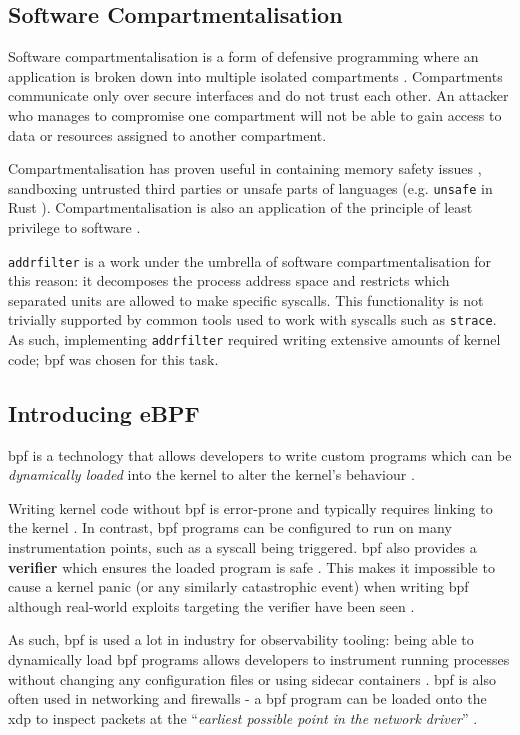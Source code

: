 \subsection{Software Compartmentalisation}
Software compartmentalisation is a form of defensive programming where an
application is broken down into multiple isolated compartments \cite{SOK}. Compartments
communicate only over secure interfaces and do not trust each other. An attacker
who manages to compromise one compartment will not be able to gain access to
data or resources assigned to another compartment. 

Compartmentalisation has proven useful in containing memory safety issues
\cite{CONFFUZZ},
sandboxing untrusted third parties \cite{ANDROID_SOK} or unsafe parts of
languages \cite{MPK} (e.g.
\texttt{unsafe} in Rust \cite{rustbook_unsafe}). Compartmentalisation is also an
application of the principle of least privilege to software \cite{PRIVMAN}.

\texttt{addrfilter} is a work under the umbrella of software
compartmentalisation for this reason: it decomposes the process address space
and restricts which separated units are allowed to make specific syscalls.
This functionality is not trivially supported by common tools used to work with
syscalls such as \texttt{strace}. As such, implementing \texttt{addrfilter}
required writing extensive amounts of kernel code; \ac{bpf} was chosen for this
task.

\subsection{Introducing eBPF}

\ac{bpf} is a technology that allows developers to write custom programs which
can be \textit{dynamically loaded} into the kernel to alter the kernel's
behaviour \cite{LEARNING_EBPF}. 

Writing kernel code without \ac{bpf} is error-prone and typically
requires linking to the kernel \cite{UNDERSTANDING_LINUX_KERNEL}. In contrast,
\ac{bpf} programs can be configured to run on many instrumentation points, such
as a syscall being triggered. \ac{bpf} also provides a \textbf{verifier} which
ensures the  loaded program is safe \cite{LEARNING_EBPF}.
This makes it impossible to cause a kernel panic (or any similarly
catastrophic event) when writing \ac{bpf} although real-world exploits targeting the
verifier have been seen \cite{BPF_VERIFIER_EXPLOIT}. 

As such, \ac{bpf} is used a lot in industry for observability tooling: being able to
dynamically load \ac{bpf} programs allows developers to instrument running processes
without changing any configuration files or using sidecar containers \cite{SIDECAR}.
\ac{bpf} is also often used in networking and firewalls 
\cite{LINUX_NETWORKING_OBSERVABILITY} - a \ac{bpf} program can
be loaded onto the \ac{xdp} to inspect packets at the ``\textit{earliest 
possible point in the network driver}'' \cite{CILIUM_BPF_XDP_INTRO}. 

